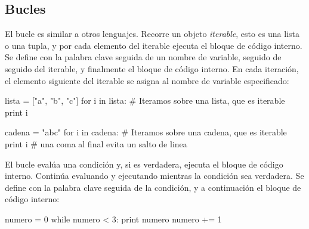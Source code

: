 \subsection{Bucles}
El bucle  es similar a  otros lenguajes. Recorre un objeto \emph{iterable},
esto es  una lista o una tupla, y por cada elemento del iterable 
ejecuta el bloque de código interno. 
Se define con la palabra clave  seguida de un nombre de variable, 
seguido de  seguido del iterable, y finalmente el bloque de código interno. 
En cada iteración, el elemento siguiente del iterable se asigna al nombre de variable 
especificado:

\begin{pyconsole}
lista = ["a", "b", "c"]
for i in lista: # Iteramos sobre una lista, que es iterable
    print i

cadena = "abc"
for i in cadena: # Iteramos sobre una cadena, que es iterable
    print i # una coma al final evita un salto de linea

\end{pyconsole}



El bucle  evalúa una condición y, si es verdadera, ejecuta el bloque
de código interno. Continúa evaluando y ejecutando mientras la condición sea verdadera.
Se define con la palabra clave  seguida de la condición, y a continuación 
el bloque de código interno:
\begin{pyconsole}
numero = 0
while numero < 3:
    print numero
    numero += 1  

\end{pyconsole}


% 
%  
%  
% 
% 
% 

%



